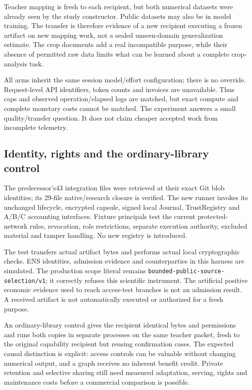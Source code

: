 \documentclass[11pt]{article}
\begin{document}
Teacher mapping is fresh to each recipient, but both numerical datasets were already seen by the study constructor. Public datasets may also be in model training. The transfer is therefore evidence of a new recipient executing a frozen artifact on new mapping work, not a sealed unseen-domain generalization estimate. The crop documents add a real incompatible purpose, while their absence of permitted raw data limits what can be learned about a complete crop-analysis task.

All arms inherit the same session model/effort configuration; there is no override. Request-level API identifiers, token counts and invoices are unavailable. Thus caps and observed operation/elapsed logs are matched, but exact compute and complete monetary costs cannot be matched. The experiment answers a small quality/transfer question. It does not claim cheaper accepted work from incomplete telemetry.

\subsection{Identity, rights and the ordinary-library control}

The predecessor's43 integration files were retrieved at their exact Git blob identities; its 29-file native/research closure is verified. The new runner invokes its unchanged lifecycle, encrypted capsule, signed local Journal, TrustRegistry and A/B/C accounting interfaces. Fixture principals test the current protected-network rules, revocation, role restrictions, separate execution authority, excluded material and tamper handling. No new registry is introduced.

The test transfers actual artifact bytes and performs actual local cryptographic checks. ENS identities, admission evidence and counterparties in this harness are simulated. The production scope literal remains \texttt{bounded-public-source-selection/v1}; it correctly refuses this scientific instrument. The artificial positive economic evidence used to reach access-test branches is not an admission result. A received artifact is not automatically executed or authorized for a fresh purpose.

An ordinary-library control gives the recipient identical bytes and permissions and runs both copies in separate processes on the same teacher packet, fresh to the original capability recipient but reusing confirmation cases. The expected causal distinction is explicit: access controls can be valuable without changing numerical output, and a graph receives no inherent benefit credit. Private retention and selective sharing still need measured adaptation, serving, rights and maintenance costs before a commercial comparison is possible.
\end{document}
